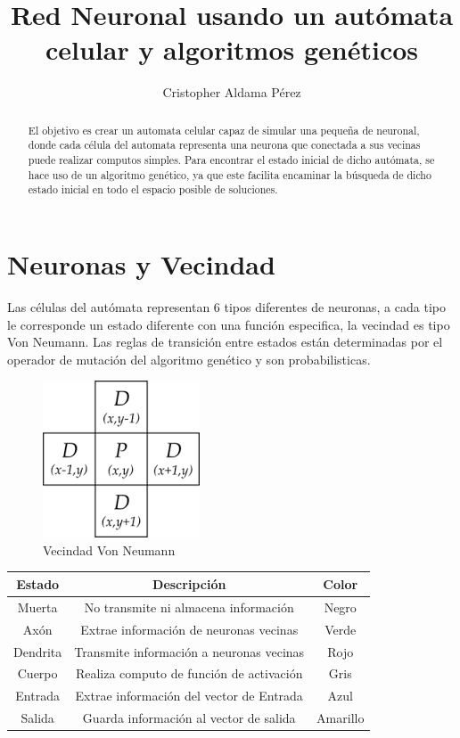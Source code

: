 \documentclass[]{article}
\title{Red Neuronal usando un autómata celular y algoritmos genéticos }
\author{Cristopher Aldama Pérez}
\begin{document}
\maketitle

\begin{abstract}
	
	El objetivo es crear un automata celular capaz de simular una pequeña de neuronal, donde
	cada célula del automata representa una neurona que conectada a sus vecinas puede realizar
	computos simples.
	Para encontrar el estado inicial de dicho autómata, se hace uso de un algoritmo 
	genético, ya que este facilita encaminar  la búsqueda de dicho estado inicial
	en todo el espacio posible de soluciones.

\end{abstract}

\section{Neuronas y Vecindad}

Las células del autómata representan 6 tipos diferentes de  neuronas, a cada tipo le corresponde un estado
diferente con una función especifica, la vecindad es tipo Von Neumann.
Las reglas de transición entre estados están determinadas por el operador de mutación del algoritmo
genético y son probabilisticas.

\begin{figure}
\centering
\includegraphics[width=0.4\linewidth]{von}
\caption{Vecindad Von Neumann}
\label{fig:von}
\end{figure}


\begin{tabular}{|c|c|c|}
	\hline Estado & Descripción & Color\\ 
	\hline Muerta & No transmite ni almacena información & Negro \\ 
	\hline Axón & Extrae información de neuronas vecinas & Verde \\ 
	\hline Dendrita & Transmite información a neuronas vecinas & Rojo \\ 
	\hline Cuerpo & Realiza computo de función de activación & Gris \\ 
	\hline Entrada & Extrae información del vector de Entrada & Azul \\ 
	\hline Salida & Guarda información al vector de salida & Amarillo \\ 
	\hline 
\end{tabular} 
\end{document}
